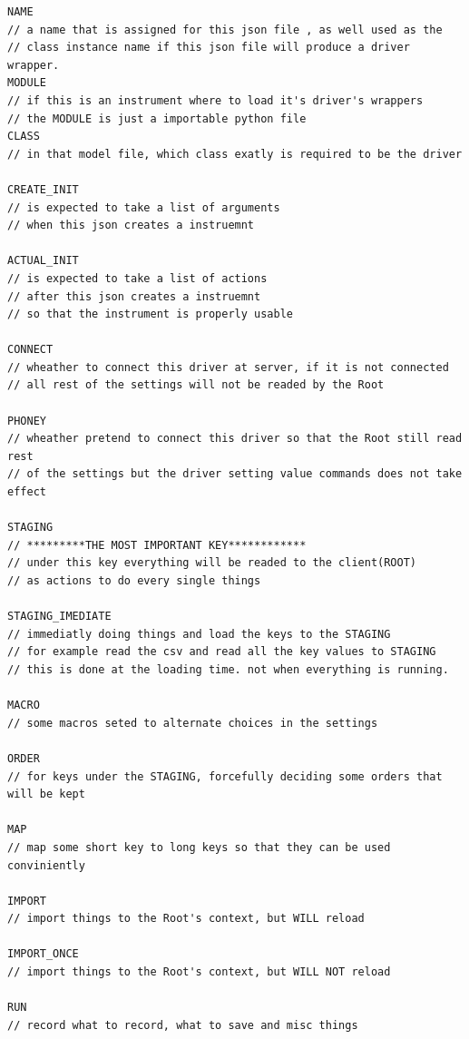 \documentclass{article}
\begin{document}
\begin{lstlisting}
NAME 
// a name that is assigned for this json file , as well used as the
// class instance name if this json file will produce a driver wrapper.
MODULE 
// if this is an instrument where to load it's driver's wrappers
// the MODULE is just a importable python file
CLASS 
// in that model file, which class exatly is required to be the driver

CREATE_INIT
// is expected to take a list of arguments
// when this json creates a instruemnt

ACTUAL_INIT
// is expected to take a list of actions 
// after this json creates a instruemnt
// so that the instrument is properly usable

CONNECT 
// wheather to connect this driver at server, if it is not connected
// all rest of the settings will not be readed by the Root

PHONEY 
// wheather pretend to connect this driver so that the Root still read rest
// of the settings but the driver setting value commands does not take effect

STAGING
// *********THE MOST IMPORTANT KEY************
// under this key everything will be readed to the client(ROOT) 
// as actions to do every single things

STAGING_IMEDIATE
// immediatly doing things and load the keys to the STAGING 
// for example read the csv and read all the key values to STAGING
// this is done at the loading time. not when everything is running.

MACRO
// some macros seted to alternate choices in the settings

ORDER
// for keys under the STAGING, forcefully deciding some orders that will be kept

MAP
// map some short key to long keys so that they can be used conviniently

IMPORT
// import things to the Root's context, but WILL reload 

IMPORT_ONCE
// import things to the Root's context, but WILL NOT reload 

RUN
// record what to record, what to save and misc things

\end{lstlisting}
\end{document}
